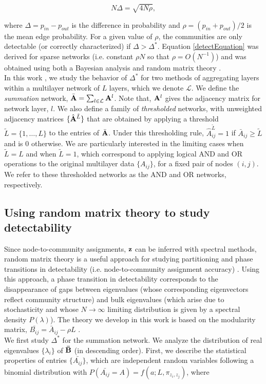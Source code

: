 \begin{equation}
\label{detectEquation}
N\Delta=\sqrt{4N\rho},
\end{equation} 

where $\Delta=p_{in}-p_{out}$ is the difference in probability and $\rho=(p_{in}+p_{out})/2$ is the mean edge probability. For a given value of $\rho$, the communities are only detectable (or correctly characterized) if $\Delta > \Delta^{*}$. Equation \ref{detectEquation} was derived for sparse networks (i.e. constant $\rho N$ so that $\rho=O(N^{-1})$) and was obtained using both a Bayesian analysis \cite{detect23} and random matrix theory \cite{detect24}.\\
\indent In this work , we study the behavior of $\Delta^{*}$ for two methods of aggregating layers within a multilayer network of $L$ layers, which we denote $\mathcal{L}$. We define the \emph{summation} network, $\bar{\bf A}=\sum_{l \in \mathcal{L}} {\bf A}^{l}$. Note that, ${\bf A}^{l}$ gives the adjacency matrix for network layer, $l$. We also define a family of \emph{thresholded} networks, with unweighted adjacency matrices $\{\hat{{\bf A}}^{\tilde{L}}\}$ that are obtained by applying a threshold $\tilde{L}=\{1, \dots, L\}$ to the entries of $\bar{\bf A}$. Under this thresholding rule, $\hat{A}_{ij}^{\tilde{L}}=1$ if $\bar{A}_{ij} \ge \tilde{L}$ and is 0 otherwise. We are particularly interested in the limiting cases when $\tilde{L}=L$ and when $\tilde{L}=1$, which correspond to applying logical AND and OR operations to the original multilayer data $\{A_{ij}\}$, for a fixed pair of nodes $(i,j)$. We refer to these thresholded networks as the AND and OR networks, respectively. 

\subsection{Using random matrix theory to study detectability}

\indent Since node-to-community assignments, ${\bf z}$ can be inferred with spectral methods, random matrix theory \cite{detect38,detect39} is a useful approach for studying partitioning and phase transitions in detectability (i.e. node-to-community assignment accuracy) \cite{detect24,peixotoHierarchAttribute,HierarchAttl}. Using this approach, a phase transition in detectability corresponds to the disappearance of  gaps between eigenvalues (whose corresponding eigenvectors reflect community structure) and bulk eigenvalues (which arise due to stochasticity and whose $N \rightarrow \infty$ limiting distribution is given by a spectral density $P(\lambda)$). The theory we develop in this work is based on the modularity matrix, $\bar{B_{ij}}=\bar{A}_{ij}-\rho L$ \cite{newmangirvan}. \\
\indent We first study $\Delta^{*}$ for the summation network. We analyze the distribution of real eigenvalues $\{\lambda_{i}\}$ of ${\bf \bar{B}}$ (in descending order). First, we describe the statistical properties of entries $\{\bar{A_{ij}}\}$, which are independent random variables following a binomial distribution with $P(\bar{A_{ij}}=A)=f(a;L,\pi_{z_{i},z_{j}})$, where

